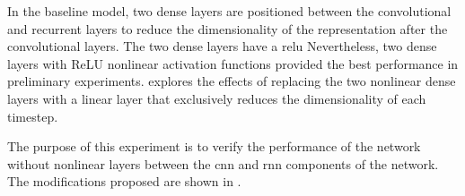 
In the baseline model, two dense layers are positioned
between the convolutional and recurrent layers to reduce the
dimensionality of the representation after the convolutional
layers. The two dense layers have a \gls{relu} Nevertheless,
two dense layers with ReLU nonlinear activation functions
provided the best performance in preliminary experiments.
 explores the effects of
replacing the two nonlinear dense layers with a linear layer
that exclusively reduces the dimensionality of each
timestep.

The purpose of this experiment is to verify the performance
of the network without nonlinear layers between the
\gls{cnn} and \gls{rnn} components of the network. The
modifications proposed are shown in .

